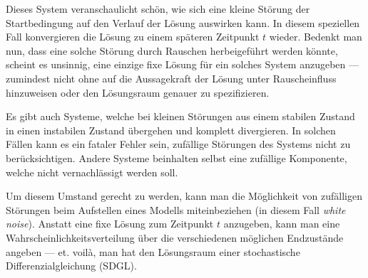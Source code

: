 Dieses System veranschaulicht schön, wie sich eine kleine Störung der Startbedingung auf den Verlauf der Lösung auswirken kann. In diesem speziellen Fall konvergieren die Lösung zu einem späteren Zeitpunkt $ t $ wieder. Bedenkt man nun, dass eine solche Störung durch Rauschen herbeigeführt werden könnte, scheint es unsinnig, eine einzige fixe Lösung für ein solches System anzugeben --- zumindest nicht ohne auf die Aussagekraft der Lösung unter Rauscheinfluss hinzuweisen oder den Lösungsraum genauer zu spezifizieren.


Es gibt auch Systeme, welche bei kleinen Störungen aus einem stabilen Zustand in einen instabilen Zustand übergehen und komplett divergieren. In solchen Fällen kann es ein fataler Fehler sein, zufällige Störungen des Systems nicht zu berücksichtigen. Andere Systeme beinhalten selbst eine zufällige Komponente, welche nicht vernachlässigt werden soll.

Um diesem Umstand gerecht zu werden, kann man die Möglichkeit von zufälligen Störungen beim Aufstellen eines Modells miteinbeziehen (in diesem Fall \textit{white noise}). Anstatt eine fixe Lösung zum Zeitpunkt $ t $ anzugeben, kann man eine Wahrscheinlichkeitsverteilung über die verschiedenen möglichen Endzustände angeben --- et. voilà, man hat den Lösungsraum einer stochastische Differenzialgleichung (SDGL).
